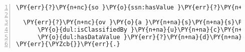 {\begin{Verbatim}[commandchars=\\\{\},numbers=left,firstnumber=1,stepnumber=1]
  \PY{err}{?}\PY{n+nc}{so }\PY{o}{ssn:hasValue }\PY{err}{?}\PY{n+na}{o}\PY{n+na}{v }.

  \PY{err}{?}\PY{n+nc}{ov }\PY{o}{a }\PY{n+na}{s}\PY{n+na}{s}\PY{n+na}{n}\PY{n+na}{:}\PY{n+na}{O}\PY{n+na}{b}\PY{n+na}{s}\PY{n+na}{e}\PY{n+na}{r}\PY{n+na}{v}\PY{n+na}{a}\PY{n+na}{t}\PY{n+na}{i}\PY{n+na}{o}\PY{n+na}{n}\PY{n+na}{V}\PY{n+na}{a}\PY{n+na}{l}\PY{n+na}{u}\PY{n+na}{e };
      \PY{o}{dul:isClassifiedBy }\PY{n+na}{u}\PY{n+na}{c}\PY{n+na}{u}\PY{n+na}{m}\PY{n+na}{:}\PY{n+na}{l}\PY{n+na}{u}\PY{n+na}{x };
      \PY{o}{dul:hasDataValue }\PY{err}{?}\PY{n+na}{d}\PY{n+na}{e}\PY{n+na}{s}\PY{n+na}{i}\PY{n+na}{r}\PY{n+na}{e}\PY{n+na}{d}\PY{n+na}{\PYZus{}}\PY{n+na}{v}\PY{n+na}{a}\PY{n+na}{l}\PY{n+na}{u}\PY{n+na}{e }.
\PY{err}{\PYZcb{}}\PY{err}{.}
\end{Verbatim}
}